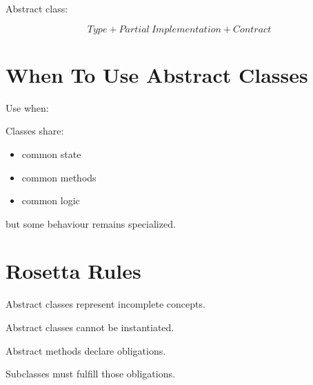 \documentclass[11pt,a4paper]{book}
\begin{document}
Abstract class:

\[
Type
+
Partial\ Implementation
+
Contract
\]


\section{When To Use Abstract Classes}

Use when:


Classes share:

\begin{itemize}
\item common state
\item common methods
\item common logic
\end{itemize}


but some behaviour remains specialized.


\section{Rosetta Rules}

\begin{rosettarule}

Abstract classes represent incomplete concepts.

\end{rosettarule}

\begin{rosettarule}

Abstract classes cannot be instantiated.

\end{rosettarule}

\begin{rosettarule}

Abstract methods declare obligations.

\end{rosettarule}

\begin{rosettarule}

Subclasses must fulfill those obligations.

\end{rosettarule}
\end{document}
